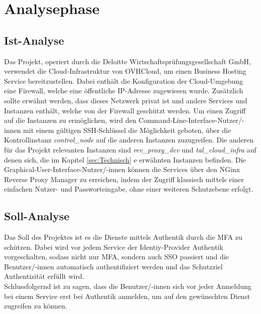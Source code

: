 \section{Analysephase} 
\label{sec:Analysephase}


\subsection{Ist-Analyse} 
\label{sec:IstAnalyse}
Das Projekt, operiert durch die Deloitte Wirtschaftsprüfungsgesellschaft GmbH, verwendet die Cloud-Infrastruktur 
von OVHCloud, um einen Business Hosting Service bereitzustellen. Dabei enthält die Konfiguration der 
Cloud-Umgebung eine Firewall, welche eine öffentliche IP-Adresse zugewiesen wurde. Zusätzlich sollte erwähnt werden, 
dass dieses Netzwerk privat ist und andere Services und Instanzen enthält, welche von der Firewall geschützt werden.
Um einen Zugriff auf die Instanzen zu ermöglichen, wird den Command-Line-Interface-Nutzer/-innen mit einem gültigen
SSH-Schlüssel die Möglichkeit geboten, über die Kontrollinstanz \textit{control\_node} auf die anderen Instanzen 
zuzugreifen. Die anderen für das Projekt relevanten Instanzen sind \textit{rev\_proxy\_dev} und \textit{tal\_cloud\_infra} 
auf denen sich, die im Kapitel \ref*{sec:Technisch} e  
erwähnten Instanzen befinden. Die Graphical-User-Interface-Nutzer/-innen können die Services über den NGinx Reverse Proxy Manager 
zu erreichen, indem der Zugriff klassisch mittels einer einfachen Nutzer- und Passworteingabe, ohne einer weiteren 
Schutzebene erfolgt.

\subsection{Soll-Analyse}
\label{sec:SollAnalyse}
Das Soll des Projektes ist es die Dienste mittels Authentik durch die \acs*{MFA} zu schützen. Dabei wird vor jedem Service 
der Identiy-Provider Authentik vorgeschalten, sodass nicht nur \acs*{MFA}, sondern auch \acs*{SSO} passiert und die 
Benutzer/-innen automatisch authentifiziert werden und das Schutzziel Authentizität erfüllt wird.
\\Schlussfolgernd ist zu sagen, dass die Benutzer/-innen sich vor jeder Anmeldung bei einem Service erst bei Authentik 
anmelden, um auf den gewünschten Dienst zugreifen zu können.



